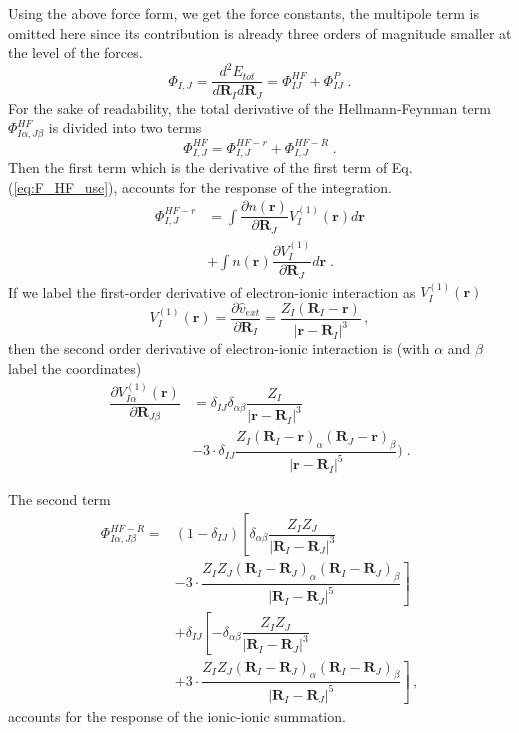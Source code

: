 \documentclass[journal=jpca,manuscript=article]{achemso}
\begin{document}
Using the above force form, we get the force constants, the multipole term is omitted here  since its contribution is already three orders of magnitude smaller at the level of the forces. 
\begin{equation}
\Phi_{I,J}=\dfrac{d^2{E_{tot}} }{d{\mathbf{R}_{I}} d{\mathbf{R}_{J}}}=\Phi_{IJ}^{HF}+\Phi_{IJ}^{P} \;.
\label{eq:Hessian_KS}
\end{equation}
For the sake of readability, the total derivative of the Hellmann-Feynman term $\Phi_{I\alpha,J\beta}^{HF}$ is divided into two terms 
\begin{equation}
\Phi_{I,J}^{HF}=\Phi_{I,J}^{HF-r}+\Phi_{I, J}^{HF-R} \;.
\end{equation}
Then the first term which is the derivative of the 
first term of Eq.(\ref{eq:F_HF_use}), accounts for the response of the integration.
\begin{eqnarray}
\Phi_{I,J}^{HF-r} & =\int {  \dfrac{\partial{n(\mathbf{r})} }  
{ \partial{\mathbf{R}_{J}} } V_{I}^{(1)}(\mathbf{r})   d \mathbf{r} }  \nonumber \\ 
       & + \int { n(\mathbf{r}) \dfrac{\partial{ V_{I}^{(1)} } }  
{ \partial{\mathbf{R}_{J}} }   d \mathbf{r} }    \;.
\label{eq:Hessian_HF_r} 
\end{eqnarray}
If we label the first-order derivative of electron-ionic interaction as $V_{I}^{(1)}(\mathbf{r})$
\begin{equation}
V_{I}^{(1)}(\mathbf{r})=\dfrac{\partial \hat{v}_{ext} }{\partial \mathbf{R}_{I} } =  \dfrac{Z_{I}(\mathbf{R}_{I}-\mathbf{r})  }{|\mathbf{r}-\mathbf{R}_{I}|^3} \,,
\end{equation}
then the second order derivative of electron-ionic interaction is (with $\alpha$ and $\beta$ label the coordinates)
\begin{eqnarray}
 \dfrac{\partial{ V_{I\alpha}^{(1)}(\mathbf{r})  } }  
{ \partial{\mathbf{R}_{J\beta}} } & = \delta_{IJ}\delta_{\alpha \beta}  \dfrac{Z_I }{|\mathbf{r}-\mathbf{R}_{I}|^3 }  \nonumber   \\
   & -3\cdot \delta_{IJ}  \dfrac{Z_I(\mathbf{R}_{I}-\mathbf{r})_{\alpha}(\mathbf{R}_{J}-\mathbf{r})_{\beta} }{|\mathbf{r}-\mathbf{R}_{I}|^5 }  )  \;. 
 \label{eq:VI_deriv_fix}
\end{eqnarray}

The second term 
\begin{eqnarray}
\Phi_{I\alpha,J\beta}^{HF-R}= & (1-\delta_{IJ})\left[ \delta_{\alpha \beta} \dfrac{Z_I Z_J}{|\mathbf{R}_I-\mathbf{R}_{J}|^3 }   \right . \nonumber  \\ 
   & \left. - 3\cdot  \dfrac{Z_I Z_J (\mathbf{R}_{I}-\mathbf{R}_{J})_{\alpha}(\mathbf{R}_{I}-\mathbf{R}_{J})_{\beta} }{|\mathbf{R}_I-\mathbf{R}_{J}|^5 }   \right] \nonumber  \\ 
     & + \delta_{IJ}\left[-\delta_{\alpha \beta} \dfrac{Z_I Z_J}{|\mathbf{R}_I-\mathbf{R}_{J}|^3 }   \right . \nonumber  \\ 
   & \left. + 3 \cdot \dfrac{Z_I Z_J (\mathbf{R}_{I}-\mathbf{R}_{J})_{\alpha}(\mathbf{R}_{I}-\mathbf{R}_{J})_{\beta} }{|\mathbf{R}_I-\mathbf{R}_{J}|^5 }   \right]  \,, 
\label{eq:Hessian_HF_R} 
\end{eqnarray}
accounts for the response of the ionic-ionic summation.
\end{document}
